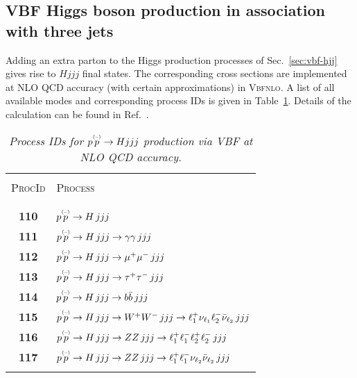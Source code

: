 \documentclass[english,12pt]{article}
\begin{document}
\subsection{VBF Higgs boson production in association with three jets}

Adding an extra parton to the Higgs production processes of
Sec.~\ref{sec:vbf-hjj} gives rise to $Hjjj$ final states. The corresponding
cross sections are implemented at NLO QCD accuracy (with certain approximations)
in \textsc{Vbfnlo}.  A list of all available modes and corresponding process IDs
is given in Table~\ref{tab:prc2}.  Details of the calculation can be found in Ref.~\cite{Figy:2007kv}.
\begin{table}[t!]
\newcommand{\lstrut}{{$\strut\atop\strut$}}
\begin{center}
\small
\begin{tabular}{c|l}
\hline
&\\
\textsc{ProcId} & \textsc{Process}  \\
&\\
\hline
&\\
\bf 110 & $p \overset{\mbox{\tiny{(--)}}}{p} \to H \, jjj$ \\
\bf 111 & $p \overset{\mbox{\tiny{(--)}}}{p} \to H \, jjj\to \gamma\gamma \, jjj$ \\
\bf 112 & $p \overset{\mbox{\tiny{(--)}}}{p} \to H \, jjj\to \mu^+\mu^- \, jjj$ \\
\bf 113 & $p \overset{\mbox{\tiny{(--)}}}{p} \to H \, jjj\to \tau^+\tau^- \, jjj$ \\
\bf 114 & $p \overset{\mbox{\tiny{(--)}}}{p} \to H \, jjj\to b\bar{b} \, jjj$ \\
\bf 115 & $p \overset{\mbox{\tiny{(--)}}}{p} \to H \, jjj\to W^+W^- \, jjj\to \ell_{1}^{+}\nu_{\ell_{1}} \ell_{2}^- 
\bar{\nu}_{\ell_{2}} \,jjj$ \\
\bf 116 & $p \overset{\mbox{\tiny{(--)}}}{p} \to H \, jjj\to ZZ \, jjj\to \ell_{1}^+ \ell_{1}^- \ell_{2}^+ \ell_{2}^- \,jjj$ \\
\bf 117 & $p \overset{\mbox{\tiny{(--)}}}{p} \to H \, jjj\to ZZ \, jjj\to \ell_{1}^+ \ell_{1}^- \nu_{\ell_{2}}  
\bar{\nu}_{\ell_{2}} \,jjj$ \\
&\\
\hline
\end{tabular}
\caption {\em  Process IDs for $p \overset{\mbox{\tiny{(--)}}}{p} \to Hjjj$ production via VBF at NLO QCD accuracy.}
\vspace{0.2cm}
\label{tab:prc2}
\end{center}
\end{table}
\end{document}
